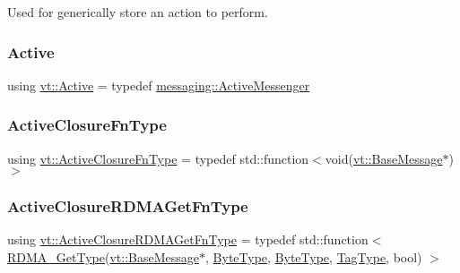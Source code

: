 Used for generically store an action to perform. 

\mbox{\label{namespacevt_ad548cc368cddb926753ac237eb454dae}} 
\subsubsection{\texorpdfstring{Active}{Active}}
{\footnotesize\ttfamily using \hyperlink{namespacevt_ad548cc368cddb926753ac237eb454dae}{vt\+::\+Active} = typedef \hyperlink{structvt_1_1messaging_1_1_active_messenger}{messaging\+::\+Active\+Messenger}}

\mbox{\label{namespacevt_a2a06c34cafcd511828f16cbf1476b924}} 
\subsubsection{\texorpdfstring{Active\+Closure\+Fn\+Type}{ActiveClosureFnType}}
{\footnotesize\ttfamily using \hyperlink{namespacevt_a2a06c34cafcd511828f16cbf1476b924}{vt\+::\+Active\+Closure\+Fn\+Type} = typedef std\+::function$<$void(\hyperlink{namespacevt_ac34f95a5e2b8109b55bfba52b074443d}{vt\+::\+Base\+Message}$\ast$)$>$}

\mbox{\label{namespacevt_aac79af69904337145f4d3d441802c932}} 
\subsubsection{\texorpdfstring{Active\+Closure\+R\+D\+M\+A\+Get\+Fn\+Type}{ActiveClosureRDMAGetFnType}}
{\footnotesize\ttfamily using \hyperlink{namespacevt_aac79af69904337145f4d3d441802c932}{vt\+::\+Active\+Closure\+R\+D\+M\+A\+Get\+Fn\+Type} = typedef std\+::function$<$ \hyperlink{namespacevt_a1cab7f4860f65a49ad2c042d6240f288}{R\+D\+M\+A\+\_\+\+Get\+Type}(\hyperlink{namespacevt_ac34f95a5e2b8109b55bfba52b074443d}{vt\+::\+Base\+Message}$\ast$, \hyperlink{namespacevt_aab8d55968084610ce3b17057981e9300}{Byte\+Type}, \hyperlink{namespacevt_aab8d55968084610ce3b17057981e9300}{Byte\+Type}, \hyperlink{namespacevt_a84ab281dae04a52a4b243d6bf62d0e52}{Tag\+Type}, bool) $>$}

